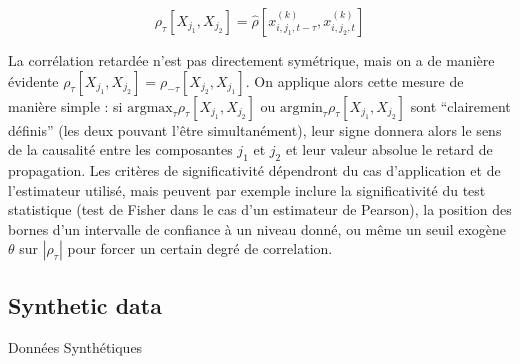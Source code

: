 \begin{equation}
\rho_{\tau}\left[X_{j_1},X_{j_2}\right] = \hat{\rho}\left[x^{(k)}_{i,j_1,t - \tau},x^{(k)}_{i,j_2,t}\right]
\end{equation}

La corrélation retardée n'est pas directement symétrique, mais on a de manière évidente $\rho_{\tau}\left[X_{j_1},X_{j_2}\right] = \rho_{-\tau}\left[X_{j_2},X_{j_1}\right]$. On applique alors cette mesure de manière simple : si $\textrm{argmax}_{\tau} \rho_{\tau}\left[X_{j_1},X_{j_2}\right]$ ou $\textrm{argmin}_{\tau} \rho_{\tau}\left[X_{j_1},X_{j_2}\right]$ sont ``clairement définis'' (les deux pouvant l'être simultanément), leur signe donnera alors le sens de la causalité entre les composantes $j_1$ et $j_2$ et leur valeur absolue le retard de propagation. Les critères de significativité dépendront du cas d'application et de l'estimateur utilisé, mais peuvent par exemple inclure la significativité du test statistique (test de Fisher dans le cas d'un estimateur de Pearson), la position des bornes d'un intervalle de confiance à un niveau donné, ou même un seuil exogène $\theta$ sur $\left|\rho_{\tau}\right|$ pour forcer un certain degré de correlation. 





\subsection{Synthetic data}{Données Synthétiques}



